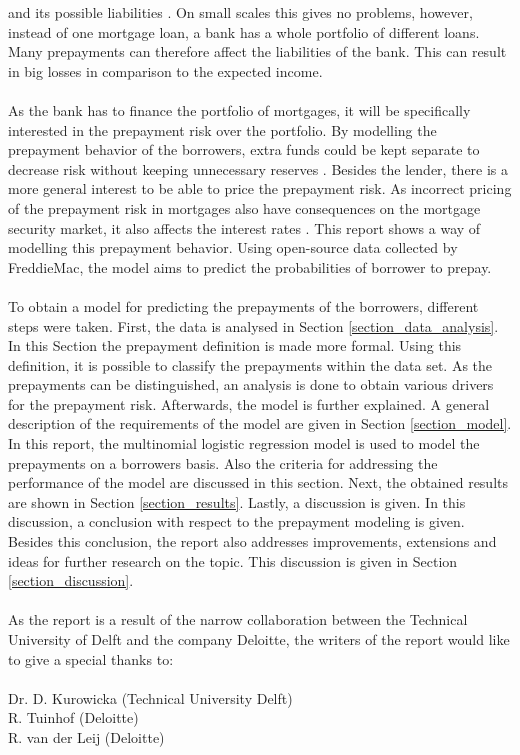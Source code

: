 and its possible liabilities \cite{jacobs2005modelling}. 
On small scales this gives no problems, however, instead of one 
mortgage loan, a bank has a whole portfolio of different loans. 
Many prepayments can therefore affect the liabilities of the bank. This 
can result in big losses in comparison to the expected income.  
\\\\
As the bank has to finance the portfolio of mortgages, it will 
be specifically interested in the prepayment risk over the portfolio.
By modelling the prepayment behavior of the borrowers, extra funds could be 
kept separate to decrease risk without keeping unnecessary 
reserves \cite{jacobs2005modelling}.
Besides the lender, there is a more general interest to be able 
to price the prepayment risk. As incorrect pricing of the prepayment risk 
in mortgages also have consequences on the mortgage security market, it also 
affects the interest rates \cite{Chinloy1989}.  
This report shows a way of modelling this prepayment behavior. 
Using open-source data collected by FreddieMac, the model aims to predict 
the probabilities of borrower to prepay. 
\\\\
To obtain a model for predicting the prepayments of the borrowers, 
different steps were taken.
First, the data is analysed in Section \ref{section_data_analysis}. In 
this Section the prepayment definition is made more formal. Using this 
definition, it is possible to classify the prepayments within the data set. 
As the prepayments can be distinguished, an analysis is done to obtain 
various drivers for the prepayment risk. Afterwards, the model is further 
explained. A general description of the requirements of the model are given in 
Section \ref{section_model}. In this report, the multinomial logistic regression 
model is used to model the prepayments on a borrowers basis. Also the criteria 
for addressing the performance of the model are discussed in this section.   
Next, the obtained results are shown in Section \ref{section_results}. Lastly, 
a discussion is given. In this discussion, a conclusion with respect to the 
prepayment modeling is given. Besides this conclusion, the report also addresses 
improvements, extensions and ideas for further research on the topic. 
This discussion is given in Section \ref{section_discussion}.
\\\\
As the report is a result of the narrow collaboration between the Technical 
University of Delft and the company Deloitte, the writers of the report would 
like to give a special thanks to:
\\\\
Dr. D. Kurowicka (Technical University Delft)  \\
R. Tuinhof (Deloitte)                           \\
R. van der Leij (Deloitte)
